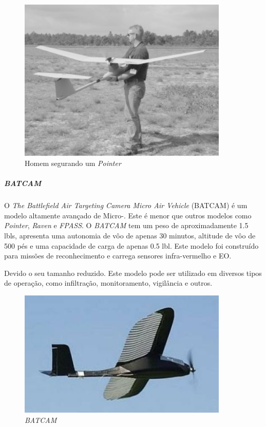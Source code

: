 \begin{figure}[h!]
\centering
\includegraphics[width=10cm]{pictures/holding_pointer.png}
\caption{ Homem segurando um \emph{Pointer}}
 \label{fig:holding_pointer}
\end{figure}


\subparagraph{ \emph{BATCAM}}
O \emph{The Battlefield Air Targeting Camera Micro Air
Vehicle} (BATCAM) é um modelo altamente avançado de Micro-\vant. Este \vant  é menor que outros modelos como \emph{Pointer}, \emph{Raven} e \emph{FPASS}.
O \emph{BATCAM} tem um peso de aproximadamente 1.5 lbls, apresenta uma autonomia de vôo de apenas 30 minutos, altitude de vôo de 500 pés e uma capacidade de carga de
apenas 0.5 lbl. Este modelo foi construído para missões de reconhecimento e carrega sensores infra-vermelho e EO.

Devido o seu tamanho reduzido. Este modelo pode ser utilizado em diversos tipos de operação, como infiltração, monitoramento, vigilância e outros. \cite{Drew2005}

\begin{figure}[h!]
\centering
\includegraphics[width=10cm]{pictures/batcam.jpg}
\caption{ \emph{BATCAM} }
 \label{fig:batcam}
\end{figure}

